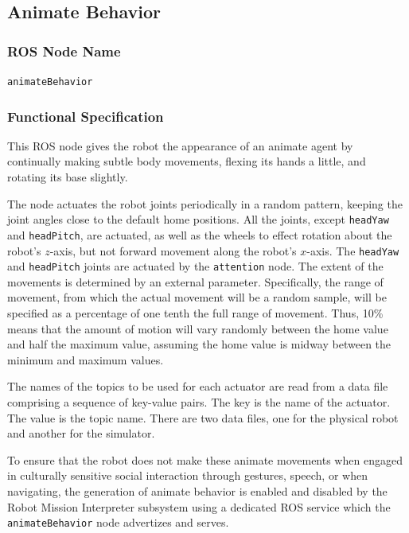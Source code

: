 \documentclass{CSSRforAfrica}
\begin{document}
\subsection{Animate Behavior}

\subsubsection*{ROS Node Name}
 {\small \verb+animateBehavior+}   


\subsubsection*{Functional Specification}
This ROS node  gives the robot the appearance of an animate agent by continually making subtle  body  movements, flexing its hands a little, and rotating its base slightly.  

The node actuates the robot joints periodically in a random pattern, keeping the joint angles close to the default home positions. All the joints, except \verb+headYaw+ and \verb+headPitch+, are actuated, as well as the wheels to effect rotation about the robot's $z$-axis, but not forward movement along the robot's $x$-axis. The {\small \verb+headYaw+} and {\small \verb+headPitch+} joints are actuated by the {\small \verb+attention+} node.   The extent of the movements is determined by an external parameter. Specifically, the range of movement, from which the actual movement will be  a random sample, will be specified as a percentage of one tenth the full range of movement.  Thus, 10\%  means that the amount of motion will vary randomly between the home value and half the maximum value, assuming the home value is midway between the minimum and maximum values.  

The names of the topics to be used for each actuator are read from a data file comprising a sequence of key-value pairs. The key is the name of the actuator. The value is the topic name.  There are two data files, one for the physical robot and another for the simulator.  

To ensure that  the robot does not make these animate movements when engaged in culturally sensitive social interaction through gestures, speech, or when navigating, the generation of animate behavior is enabled and disabled by the Robot Mission Interpreter  subsystem using  a dedicated ROS service which the {\small \verb+animateBehavior+}   node advertizes and serves.
\end{document}
